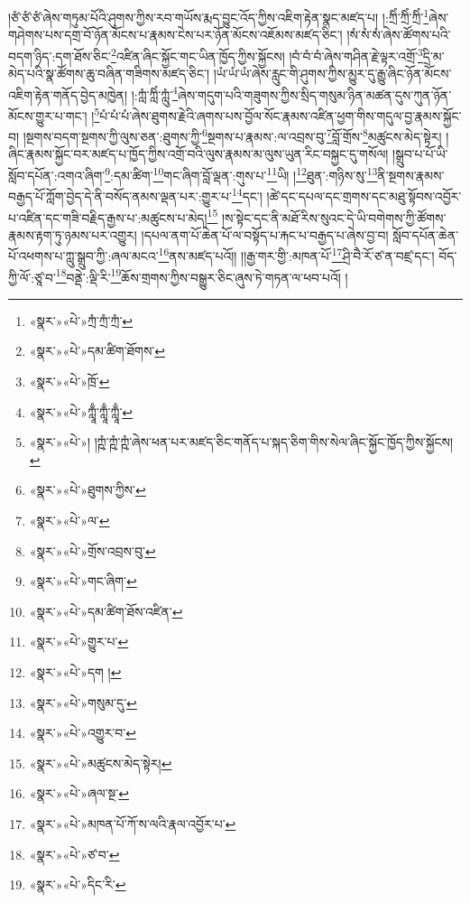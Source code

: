།ཙཾ་ཙཾ་ཙཾ་ཞེས་གཏུམ་པོའི་ཤུགས་ཀྱིས་རབ་གཡོས་རྨད་བྱུང་འོད་ཀྱིས་འཇིག་རྟེན་སྣང་མཛད་པ། །:ཀྲིཾ་ཀྲིཾ་ཀྲིཾ་\footnote{«སྣར་»«པེ་»ཀྲཾ་ཀྲཾ་ཀྲཾ་}ཞེས་གཤེགས་པས་དགྲ་བོ་ཉོན་མོངས་པ་རྣམས་ངེས་པར་ཉོན་མོངས་འཇོམས་མཛད་ཅིང་། །སཾ་སཾ་སཾ་ཞེས་ཚོགས་པའི་བདག་ཉིད་:དག་ཐོས་ཅིང་\footnote{«སྣར་»«པེ་»དམ་ཚིག་ཐོགས་}འཛིན་ཞིང་སྐྱོང་གང་ཡིན་ཁྱོད་ཀྱིས་སྐྱོངས། །བཾ་བཾ་བཾ་ཞེས་གཤིན་རྗེ་ལྟར་འགྲོ་\footnote{«སྣར་»«པེ་»ཁྲོ་}དྲི་མ་མེད་པའི་སྣ་ཚོགས་ཆུ་བཞིན་གཟིགས་མཛད་ཅིང་། །ཡཾ་ཡཾ་ཡཾ་ཞེས་རླུང་གི་ཤུགས་ཀྱིས་མྱུར་དུ་རྒྱུ་ཞིང་ཉོན་མོངས་འཇིག་རྟེན་གནོད་བྱེད་མཁྱེན། །:ཀླཾ་ཀླིཾ་ཀླུཾ་\footnote{«སྣར་»«པེ་»ཀླཱྃ་ཀླཱྃ་ཀླཱྃ་}ཞེས་གདུག་པའི་གཟུགས་ཀྱིས་སྲིད་གསུམ་ཉིན་མཚན་དུས་ཀུན་ཉོན་མོངས་གྱུར་པ་གང་། །\footnote{«སྣར་»«པེ་»། །ཀྵཾ་ཀྵཾ་ཀྵཾ་ཞེས་ཕན་པར་མཛད་ཅིང་གནོད་པ་སྐད་ཅིག་གིས་སེལ་ཞིང་སྐྱོང་ཁྱོད་ཀྱིས་སྐྱོངས། }པཾ་པཾ་པཾ་ཞེས་ཐུགས་རྗེའི་ཞགས་པས་བྱོལ་སོང་རྣམས་འཛིན་ཕྱག་གིས་གདུལ་བྱ་རྣམས་སྐྱོང་བ། །སྔགས་བདག་སྔགས་ཀྱི་ལུས་ཅན་:ཐུགས་ཀྱི་\footnote{«སྣར་»«པེ་»ཐུགས་ཀྱིས་}སྔགས་པ་རྣམས་:ལ་འབྲས་བུ་\footnote{«སྣར་»«པེ་»ལ་}བློ་གྲོས་\footnote{«སྣར་»«པེ་»གྲོས་འབྲས་བུ་}མཚུངས་མེད་སྟེར། །ཞིང་རྣམས་སྐྱོང་བར་མཛད་པ་ཁྱོད་ཀྱིས་འགྲོ་བའི་ལུས་རྣམས་མ་ལུས་ཡུན་རིང་བསྐྱང་དུ་གསོལ། །སྒྲུབ་པ་པོ་ཡི་སློབ་དཔོན་:འགའ་ཞིག་\footnote{«སྣར་»«པེ་»གང་ཞིག་}:དམ་ཚིག་\footnote{«སྣར་»«པེ་»དམ་ཚིག་ཐོས་འཛིན་}གང་ཞིག་བློ་ལྡན་:གུས་པ་\footnote{«སྣར་»«པེ་»གྱུར་པ་}ཡི། །\footnote{«སྣར་»«པེ་»དག །}ཐུན་:གཉིས་སུ་\footnote{«སྣར་»«པེ་»གསུམ་དུ་}ནི་སྔགས་རྣམས་བརྒྱད་པོ་ཀློག་བྱེད་དེ་ནི་བསོད་ནམས་ལྡན་པར་:གྱུར་པ་\footnote{«སྣར་»«པེ་»འགྱུར་བ་}དང་། །ཚེ་དང་དཔལ་དང་གྲགས་དང་མཐུ་སྟོབས་འབྱོར་པ་འཛིན་དང་གཟི་བརྗིད་རྒྱས་པ་:མཚུངས་པ་མེད།\footnote{«སྣར་»«པེ་»མཚུངས་མེད་སྟེར།} །ས་སྟེང་དང་ནི་མཐོ་རིས་སུའང་དེ་ཡི་བགེགས་ཀྱི་ཚོགས་རྣམས་རྟག་ཏུ་ཉམས་པར་འགྱུར། །དཔལ་ནག་པོ་ཆེན་པོ་ལ་བསྟོད་པ་རྐང་པ་བརྒྱད་པ་ཞེས་བྱ་བ། སློབ་དཔོན་ཆེན་པོ་འཕགས་པ་ཀླུ་སྒྲུབ་ཀྱི་:ཞལ་མངའ་\footnote{«སྣར་»«པེ་»ཞལ་སྔ་}ནས་མཛད་པའོ།། །།རྒྱ་གར་གྱི་:མཁན་པོ་\footnote{«སྣར་»«པེ་»མཁན་པོ་ཀོ་ས་ལའི་རྣལ་འབྱོར་པ་}ཤྲི་བཻ་རོ་ཙ་ན་བཛྲ་དང་། བོད་ཀྱི་ལོ་:ཙཱ་བ་\footnote{«སྣར་»«པེ་»ཙ་བ་}བནྡེ་:ལྡི་རི་\footnote{«སྣར་»«པེ་»དིང་རི་}ཆོས་གྲགས་ཀྱིས་བསྒྱུར་ཅིང་ཞུས་ཏེ་གཏན་ལ་ཕབ་པའོ། ། 